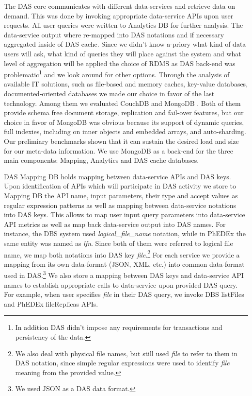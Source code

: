 \documentclass[a4paper]{jpconf}
\begin{document}
The DAS core communicates with different data-services and retrieve
data on demand. This was done by invoking appropriate data-service APIs
upon user requests. All user queries were written to Analytics DB
for further analysis. The data-service output where re-mapped into
DAS notations and if necessary aggregated inside of DAS cache.
Since we didn't know a-priory what kind of data users will ask, 
what kind of queries they will place against the system and what
level of aggregation will be applied the choice
of RDMS as DAS back-end was problematic\footnote{In addition DAS 
didn't impose any requirements for transactions and persistency of the data.} 
and we look around for other options. Through the analysis of available IT solutions, 
such as file-based and memory caches, 
key-value databases, documented-oriented databases we made our choice in favor 
of the last technology. Among them we evaluated CouchDB \cite{CouchDB} and 
MongoDB \cite{MongoDB}. Both of them provide schema free document
storage, replication and fail-over features, but our choice in favor of 
MongoDB was obvious because its support of dynamic queries, 
full indexies, including on inner objects and embedded arrays,
and auto-sharding. Our prelimiary benchmarks shown that it can sustain
the desired load and size for our meta-data information. We use MongoDB as a back-end 
for the three main components: Mapping, Analytics and DAS cache databases. 

DAS Mapping DB holds mapping between data-service APIs and DAS keys. 
Upon identification of APIs which will participate in DAS activity 
we store to Mapping DB the API name, input parameters, their type and accept 
values as regular expression patterns as well as mapping between data-service 
notations into DAS keys. This allows to map user input query parameters into
data-service API metrics as well as map back data-service output into DAS names.
For instance, the DBS system \cite{DBS}
used {\it logical\_file\_name} notation, while in PhEDEx
\cite{PhEDEx}
the same entity was named as {\it lfn}. Since both of them were referred to
logical file name, we map both notations into DAS key {\it file}.\footnote{We
also deal with physical file names, but still used {\it file} to refer to them in
DAS notation, since simple regular expressions were used to identify {\it file}
meaning from the provided value.}
For each service we provide a mapping from its own data-format (JSON, XML, etc.) into
common data-format used in DAS.\footnote{We used JSON as a DAS data format.}
We also store a mapping between DAS keys and data-service API names to
establish appropriate calls to data-service upon provided DAS query. For example,
when user specifies {\it file} in their DAS query, we invoke DBS listFiles and PhEDEx
fileReplicas APIs. 
\end{document}
